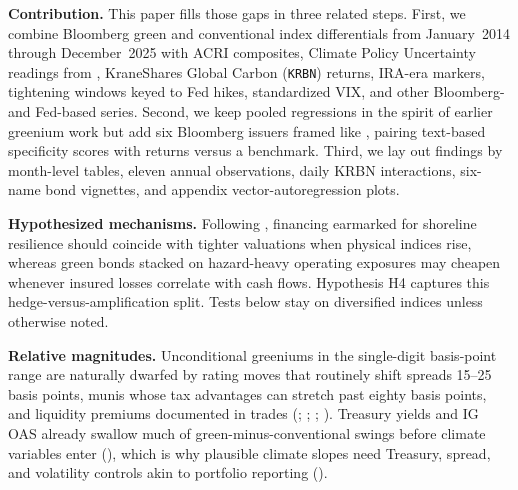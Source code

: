 \documentclass[
  11pt,
]{article}
\begin{document}
\textbf{Contribution.} This paper fills those gaps in three related steps. First, we combine Bloomberg green and conventional index differentials from January~2014 through December~2025 with ACRI composites, Climate Policy Uncertainty readings from , KraneShares Global Carbon (\texttt{KRBN}) returns, IRA-era markers, tightening windows keyed to Fed hikes, standardized VIX, and other Bloomberg- and Fed-based series. Second, we keep pooled regressions in the spirit of earlier greenium work but add six Bloomberg issuers framed like , pairing text-based specificity scores with returns versus a benchmark. Third, we lay out findings by month-level tables, eleven annual observations, daily KRBN interactions, six-name bond vignettes, and appendix vector-autoregression plots.

\textbf{Hypothesized mechanisms.} Following , financing earmarked for shoreline resilience should coincide with tighter valuations when physical indices rise, whereas green bonds stacked on hazard-heavy operating exposures may cheapen whenever insured losses correlate with cash flows. Hypothesis H4 captures this hedge-versus-amplification split. Tests below stay on diversified indices unless otherwise noted.

\textbf{Relative magnitudes.} Unconditional greeniums in the single-digit basis-point range are naturally dwarfed by rating moves that routinely shift spreads 15--25 basis points, munis whose tax advantages can stretch past eighty basis points, and liquidity premiums documented in trades (; ; ; ). Treasury yields and IG OAS already swallow much of green-minus-conventional swings before climate variables enter (), which is why plausible climate slopes need Treasury, spread, and volatility controls akin to portfolio reporting ().
\end{document}
